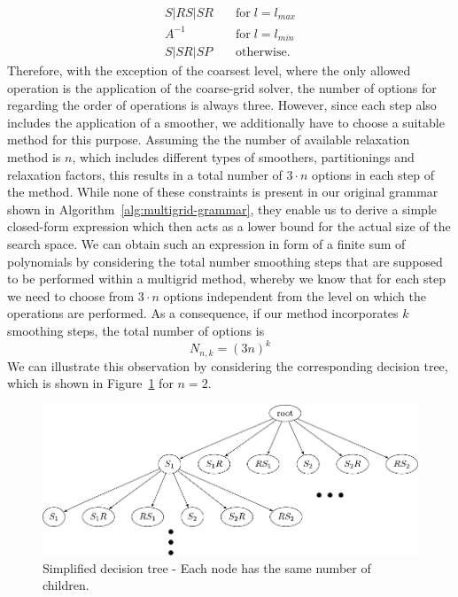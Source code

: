 \begin{align*}
	S | RS | SR & \quad \text{for} \; l = l_{max} \\
	A^{-1} & \quad \text{for} \; l = l_{min} \\
	S | SR | SP & \quad \text{otherwise}.
\end{align*}
Therefore, with the exception of the coarsest level, where the only allowed operation is the application of the coarse-grid solver, the number of options for regarding the order of operations is always three.
However, since each step also includes the application of a smoother, we additionally have to choose a suitable method for this purpose.
Assuming the the number of available relaxation method is $n$, which includes different types of smoothers, partitionings and relaxation factors, this results in a total number of $3 \cdot n$ options in each step of the method. 
While none of these constraints is present in our original grammar shown in Algorithm~\ref{alg:multigrid-grammar}, they enable us to derive a simple closed-form expression which then acts as a lower bound for the actual size of the search space.
We can obtain such an expression in form of a finite sum of polynomials by considering the total number smoothing steps that are supposed to be performed within a multigrid method, whereby we know that for each step we need to choose from $3 \cdot n$ options independent from the level on which the operations are performed.
As a consequence, if our method incorporates $k$ smoothing steps, the total number of options is 
\begin{equation}
	N_{n,k} = (3 n)^k
	\label{eq:simplified-number-of-options}
\end{equation}
We can illustrate this observation by considering the corresponding decision tree, which is shown in Figure~\ref{fig:decision-tree} for $n = 2$.
\begin{figure}
	\centering
	\includegraphics[scale=0.8]{figures/trees/decision_tree_annotated.pdf}
	\caption{Simplified decision tree - Each node has the same number of children.}
	\label{fig:decision-tree}
\end{figure}
